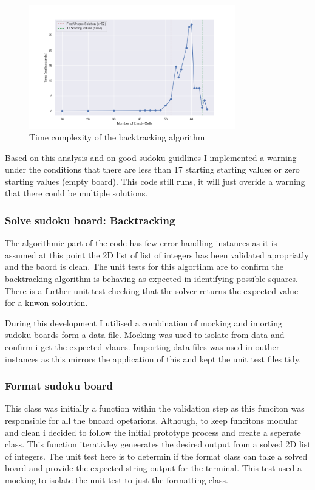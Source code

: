 \documentclass{report}
\begin{document}
\begin{figure}[H]
    \centering
    \includegraphics[width=0.8\textwidth]{Images/time_complexity.png}
    \caption{Time complexity of the backtracking algorithm}
    \label{fig:time_complexity}
\end{figure}

Based on this analysis and on good sudoku guidlines I implemented a warning under the conditions that there are less than 17 starting starting values or zero starting values (empty board).
This code still runs, it will just overide a warning that there could be multiple solutions.


\subsubsection*{Solve sudoku board: Backtracking}
The algorithmic part of the code has few error handling instances as it is assumed at this point
the 2D list of list of integers has been validated apropriatly and the baord is clean.
The unit tests for this algortihm are to confirm the backtracking algorithm is behaving as expected
in identifying possible squares. There is a further unit test checking that the solver returns the expected value for a knwon soloution.

During this development I utilised a combination of mocking and imorting sudoku boards form a data file.
Mocking was used to isolate from data and confirm i get the expected vlaues. Importing data files was used in outher instances
as this mirrors the application of this and kept the unit test files tidy.


\subsubsection*{Format sudoku board}
This class was initially a function within the validation step as this funciton was responsible for all the bnoard opetarions.
Although, to keep funcitons modular and clean i decided to follow the initial prototype process and create a seperate class.
This function iterativley geneerates the desired output from a solved 2D list of integers.
The unit test here is to determin if the format class can take a solved board and provide the expected string output for the terminal.
This test used a mocking to isolate the unit test to just the formatting class.
\end{document}
